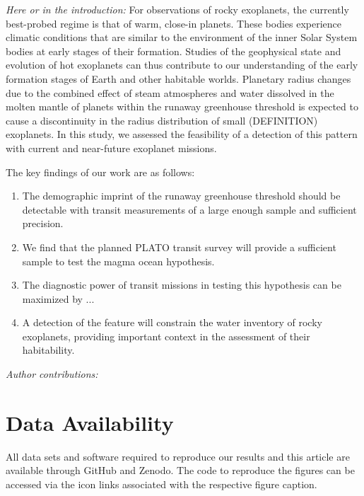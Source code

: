 \documentclass[modern]{aastex631}
\begin{document}
\begin{note}
    \textit{Here or in the introduction:} For observations of rocky exoplanets, the currently best-probed regime is that of warm, close-in planets.
    These bodies experience climatic conditions that are similar to the environment of the inner Solar System bodies at early stages of their formation.
    Studies of the geophysical state and evolution of hot exoplanets can thus contribute to our understanding of the early formation stages of Earth and other habitable worlds.
    Planetary radius changes due to the combined effect of steam atmospheres and water dissolved in the molten mantle of planets within the runaway greenhouse threshold is expected to cause a discontinuity in the radius distribution of small (DEFINITION) exoplanets.
    In this study, we assessed the feasibility of a detection of this pattern with current and near-future exoplanet missions.
\end{note}

The key findings of our work are as follows:
\begin{enumerate}
    \item The demographic imprint of the runaway greenhouse threshold should be detectable with transit measurements of a large enough sample and sufficient precision.
    \item We find that the planned PLATO transit survey will provide a sufficient sample to test the magma ocean hypothesis.
    \item The diagnostic power of transit missions in testing this hypothesis can be maximized by ...
    \item A detection of the feature will constrain the water inventory of rocky exoplanets, providing important context in the assessment of their habitability.
\end{enumerate}




\begin{large}\textit{Author contributions:}\end{large}

\section*{Data Availability}
All data sets and software required to reproduce our results and this article are available through GitHub and Zenodo.
The code to reproduce the figures can be accessed via the icon links associated with the respective figure caption.






\end{document}
